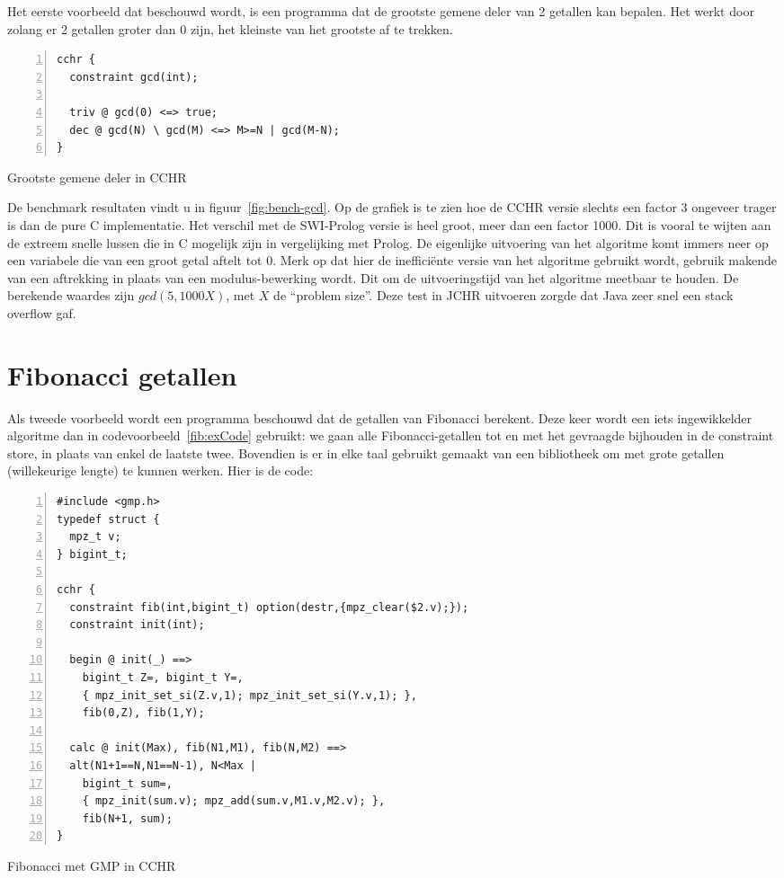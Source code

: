 Het eerste voorbeeld dat beschouwd wordt, is een programma dat de grootste gemene deler van 2 getallen kan bepalen. Het werkt door zolang er 2 getallen groter dan 0 zijn, het kleinste van het grootste af te trekken. 
\begin{exCode}
\begin{Verbatim}[frame=single,numbers=left]
cchr {
  constraint gcd(int);

  triv @ gcd(0) <=> true;
  dec @ gcd(N) \ gcd(M) <=> M>=N | gcd(M-N);
}
\end{Verbatim}
\caption{\label{code:gcd} Grootste gemene deler in CCHR}
\end{exCode}
De benchmark resultaten vindt u in figuur~\ref{fig:bench-gcd}. Op de grafiek is te zien hoe de CCHR versie slechts een factor 3 ongeveer trager is dan de pure C implementatie. Het verschil met de SWI-Prolog versie is heel groot, meer dan een factor 1000. Dit is vooral te wijten aan de extreem snelle lussen die in C mogelijk zijn in vergelijking met Prolog. De eigenlijke uitvoering van het algoritme komt immers neer op een variabele die van een groot getal aftelt tot 0. Merk op dat hier de ineffici\"ente versie van het algoritme gebruikt wordt, gebruik makende van een aftrekking in plaats van een modulus-bewerking wordt. Dit om de uitvoeringstijd van het algoritme meetbaar te houden. De berekende waardes zijn $gcd(5,1000 X)$, met $X$ de ``problem size''. Deze test in JCHR uitvoeren zorgde dat Java zeer snel een stack overflow gaf.

\section{Fibonacci getallen} \label{sec:bench-fib}

Als tweede voorbeeld wordt een programma beschouwd dat de getallen van Fibonacci berekent. Deze keer wordt een iets ingewikkelder algoritme dan in codevoorbeeld~\ref{fib:exCode} gebruikt: we gaan alle Fibonacci-getallen tot en met het gevraagde bijhouden in de constraint store, in plaats van enkel de laatste twee. Bovendien is er in elke taal gebruikt gemaakt van een bibliotheek om met grote getallen (willekeurige lengte) te kunnen werken. Hier is de code:
\begin{exCode}
\begin{Verbatim}[frame=single,numbers=left]
#include <gmp.h>
typedef struct {
  mpz_t v;
} bigint_t;

cchr {
  constraint fib(int,bigint_t) option(destr,{mpz_clear($2.v);});
  constraint init(int);
  
  begin @ init(_) ==> 
    bigint_t Z=, bigint_t Y=, 
    { mpz_init_set_si(Z.v,1); mpz_init_set_si(Y.v,1); },
    fib(0,Z), fib(1,Y);

  calc @ init(Max), fib(N1,M1), fib(N,M2) ==>
  alt(N1+1==N,N1==N-1), N<Max |
    bigint_t sum=,
    { mpz_init(sum.v); mpz_add(sum.v,M1.v,M2.v); },
    fib(N+1, sum);
}
\end{Verbatim}
\caption{\label{code:fibgmp} Fibonacci met GMP in CCHR}
\end{exCode}

